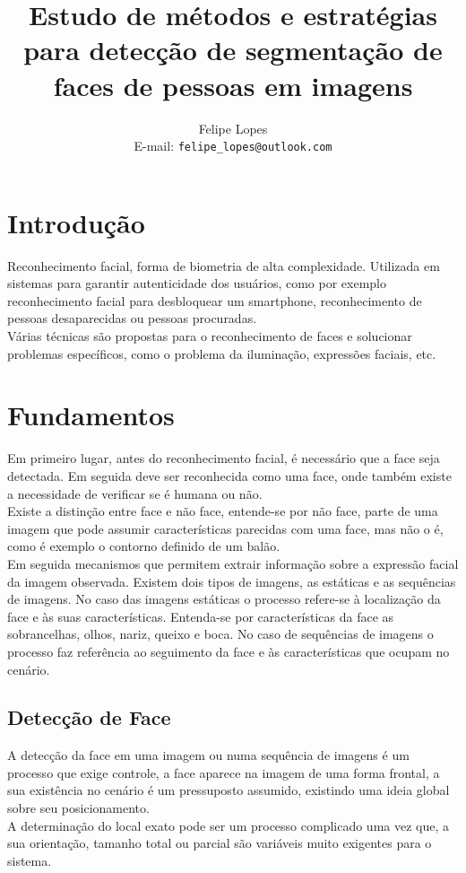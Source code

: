 \documentclass[a4paper,11pt]{article}
\title{Estudo de métodos e estratégias para detecção de segmentação de faces de pessoas em imagens}
\author{Felipe Lopes\\E-mail: {\tt felipe\_lopes@outlook.com}}
\date{}
\begin{document}
\graphicspath{ {images/} }
\maketitle

\begin{multicols}{2}
\section{Introdução}
Reconhecimento facial, forma de biometria de alta complexidade. Utilizada em sistemas para garantir autenticidade dos usuários, como por exemplo reconhecimento facial para desbloquear um smartphone, reconhecimento de pessoas desaparecidas ou pessoas procuradas.\\
Várias técnicas são propostas para o reconhecimento de faces e solucionar problemas específicos, como o problema da iluminação, expressões faciais, etc.\\

\section{Fundamentos}
Em primeiro lugar, antes do reconhecimento facial, é necessário que a face seja detectada. Em seguida deve ser reconhecida como uma face, onde também existe a necessidade de verificar se é humana ou não.\\
Existe a distinção entre face e não face, entende-se por não face, parte de uma imagem que pode assumir características parecidas com uma face, mas não o é, como é exemplo o contorno definido de um balão. \\
Em seguida mecanismos que permitem extrair informação sobre a expressão facial da imagem observada. Existem dois tipos de imagens, as estáticas e as sequências de imagens. No caso das imagens estáticas o processo refere-se à
localização da face e às suas características. Entenda-se por características da face as sobrancelhas, olhos, nariz, queixo e boca. No caso de sequências de imagens o processo faz referência ao seguimento da face e às características que ocupam no cenário.  \cite{ref:carvalho2004b}

\subsection{Detecção de Face}
A detecção da face em uma imagem ou numa sequência de imagens é um processo que exige controle, a face aparece na imagem de uma forma frontal, a sua existência no cenário é um pressuposto assumido, existindo uma ideia global sobre seu posicionamento.\\
A determinação do local exato pode ser um processo complicado uma vez que, a sua orientação, tamanho total ou parcial são variáveis muito exigentes para o sistema. \cite{ref:carvalho2004b} 


\end{multicols}
\end{document}
